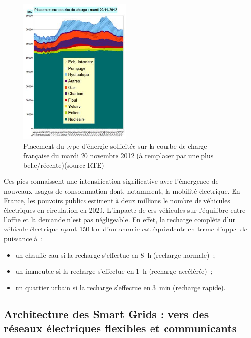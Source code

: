 \begin{figure}[!htbp]
 \begin{center}
  \includegraphics[width=0.5\textwidth]{images/problematique/ccharge.jpg}
 \end{center}
 \caption{Placement du type d'énergie sollicitée sur la courbe de charge 
française du mardi 20 novembre 2012 (à remplacer par une plus 
belle/récente)(source RTE)}
 \label{fig:courbeCharge}
\end{figure}

Ces pics connaissent une intensification significative avec 
l'émergence de nouveaux usages de consommation dont, notamment, la mobilité 
électrique. En France, les pouvoirs publics estiment à deux millions le nombre 
de véhicules 
électriques en circulation en 2020. L'impacte de ces véhicules sur l'équilibre 
entre l'offre et la demande n'est pas négligeable. En effet, la recharge 
complète d'un véhicule électrique ayant 150 km d'autonomie est équivalente en 
terme d'appel de puissance à~:
\begin{itemize}
\item un chauffe-eau si la recharge s'effectue en 8~h (recharge normale)~;
\item un immeuble si la recharge s'effectue en 1~h (recharge accélérée)~;
\item un quartier urbain si la recharge s'effectue en 3~min (recharge rapide).
\end{itemize}



\subsection{Architecture des Smart Grids : vers des réseaux électriques 
flexibles et communicants}

